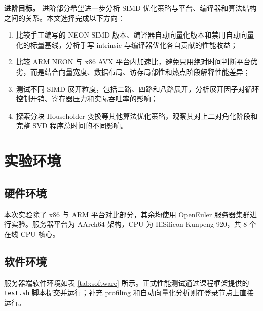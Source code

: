 \documentclass[UTF8,a4paper]{ctexart}
\begin{document}
\textbf{进阶目标。} 进阶部分希望进一步分析 SIMD 优化策略与平台、编译器和算法结构之间的关系。本文选择完成以下方向：
\begin{enumerate}
  \item 比较手工编写的 NEON SIMD 版本、编译器自动向量化版本和禁用自动向量化的标量基线，分析手写 intrinsic 与编译器优化各自贡献的性能收益；
  \item 比较 ARM NEON 与 x86 AVX 平台内加速比，避免只用绝对时间判断平台优劣，而是结合向量宽度、数据布局、访存局部性和热点阶段解释性能差异；
  \item 测试不同 SIMD 展开粒度，包括二路、四路和八路展开，分析展开因子对循环控制开销、寄存器压力和实际吞吐率的影响；
  \item 探索分块 Householder 变换等其他算法优化策略，观察其对上二对角化阶段和完整 SVD 程序总时间的不同影响。
\end{enumerate}

\section{实验环境}

\subsection{硬件环境}
本次实验除了 x86 与 ARM 平台对比部分，其余均使用 OpenEuler 服务器集群进行实验。服务器平台为 AArch64 架构，CPU 为 HiSilicon Kunpeng-920，共 8 个在线 CPU 核心。

\subsection{软件环境}
服务器端软件环境如表 \ref{tab:software} 所示。正式性能测试通过课程框架提供的 \texttt{test.sh} 脚本提交并运行；补充 profiling 和自动向量化分析则在登录节点上直接运行。

\begin{table}[H]
  \centering
  \caption{实验软件环境}
  \label{tab:software}
\end{table}
\end{document}

